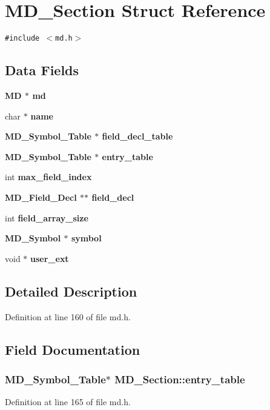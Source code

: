 \section{MD\_\-Section Struct Reference}
\label{structMD__Section}
{\tt \#include $<$md.h$>$}

\subsection*{Data Fields}
\begin{CompactItemize}
\item 
\bf{MD} $\ast$ \bf{md}
\item 
char $\ast$ \bf{name}
\item 
\bf{MD\_\-Symbol\_\-Table} $\ast$ \bf{field\_\-decl\_\-table}
\item 
\bf{MD\_\-Symbol\_\-Table} $\ast$ \bf{entry\_\-table}
\item 
int \bf{max\_\-field\_\-index}
\item 
\bf{MD\_\-Field\_\-Decl} $\ast$$\ast$ \bf{field\_\-decl}
\item 
int \bf{field\_\-array\_\-size}
\item 
\bf{MD\_\-Symbol} $\ast$ \bf{symbol}
\item 
void $\ast$ \bf{user\_\-ext}
\end{CompactItemize}


\subsection{Detailed Description}




Definition at line 160 of file md.h.

\subsection{Field Documentation}
\subsubsection{\setlength{\rightskip}{0pt plus 5cm}\bf{MD\_\-Symbol\_\-Table}$\ast$ \bf{MD\_\-Section::entry\_\-table}}\label{structMD__Section_efaf1eb833608de0fd1909ecb40e2671}




Definition at line 165 of file md.h.

